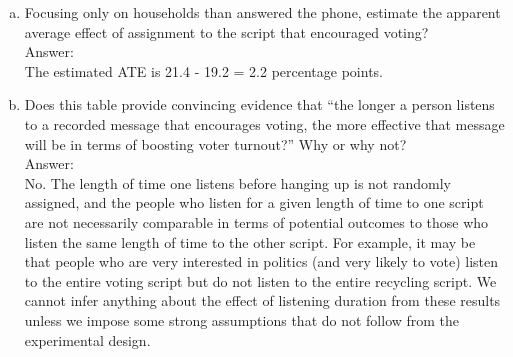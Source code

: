 \documentclass[11pt,notitlepage]{article}\usepackage[]{graphicx}\usepackage[]{color}
\begin{document}
\begin{enumerate}[a)]
\item Focusing only on households than answered the phone, estimate the apparent average effect of assignment to the script that encouraged voting?\\
Answer:\\
The estimated ATE is 21.4 - 19.2 = 2.2 percentage points.


\item Does this table provide convincing evidence that ``the longer a person listens to a recorded message that encourages voting, the more effective that message will be in terms of boosting voter turnout?'' Why or why not?\\
Answer:\\
No. The length of time one listens before hanging up is not randomly assigned, and the people who listen for a given length of time to one script are not necessarily comparable in terms of potential outcomes to those who listen the same length of time to the other script. For example, it may be that people who are very interested in politics (and very likely to vote) listen to the entire voting script but do not listen to the entire recycling script. We cannot infer anything about the effect of listening duration from these results unless we impose some strong assumptions that do not follow from the experimental design. 

\end{enumerate}
\end{document}
